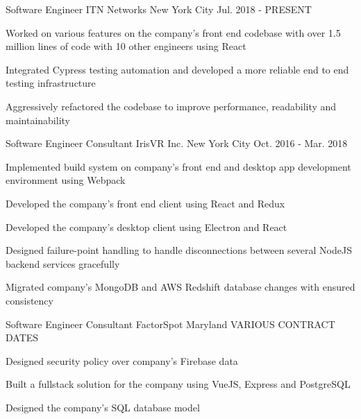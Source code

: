 

\begin{cventries}

  \cventry
    {Software Engineer} %
    {ITN Networks} %
    {New York City} %
    {Jul. 2018 - PRESENT} %
    {
      \begin{cvitems} %
        \item {Worked on various features on the company's front end codebase with over 1.5 million lines of code with 10 other engineers using React}
        \item {Integrated Cypress testing automation and developed a more reliable end to end testing infrastructure} 
        \item {Aggressively refactored the codebase to improve performance, readability and maintainability} 
      \end{cvitems}
    }

  \cventry
    {Software Engineer Consultant} %
    {IrisVR Inc.} %
    {New York City} %
    {Oct. 2016 - Mar. 2018} %
    {
      \begin{cvitems} %
        \item {Implemented build system on company's front end and desktop app development environment using Webpack}
        \item {Developed the company's front end client using React and Redux}
        \item {Developed the company's desktop client using Electron and React}
        \item {Designed failure-point handling to handle disconnections between several NodeJS backend services gracefully}
        \item {Migrated company's MongoDB and AWS Redshift database changes with ensured consistency}
      \end{cvitems}
    }

  \cventry
    {Software Engineer Consultant} %
    {FactorSpot} %
    {Maryland} %
    {VARIOUS CONTRACT DATES} %
    {
      \begin{cvitems} %
        \item {Designed security policy over company's Firebase data}
        \item {Built a fullstack solution for the company using VueJS, Express and PostgreSQL}
        \item {Designed the company's SQL database model}
      \end{cvitems}
    }


\end{cventries}

